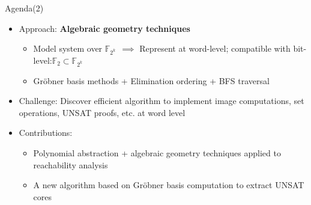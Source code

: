 \documentclass[xcolor=dvipsnames]{beamer}
\newcommand{\Fkk}{{\mathbb{F}}_{2^k}}
\newcommand{\Grobner}{Gr\"{o}bner\xspace}
\newcommand{\bi}{\begin{itemize}}
\newcommand{\ei}{\end{itemize}}
\begin{document}

\begin{frame}{\large {Agenda(2)}}
\bi
\item Approach: {\bf Algebraic geometry techniques}
	\begin{itemize}
	\item Model system over $\Fkk~~\implies$ Represent at word-level; compatible with bit-level:$\mathbb F_2\subset \Fkk$ 
	\item  \Grobner basis methods + Elimination ordering + BFS traversal
	\ei
\item  Challenge: Discover efficient algorithm to implement image computations, 
        set operations, UNSAT proofs, etc. at word level
\item  Contributions: 
    \bi
    \item Polynomial abstraction + algebraic geometry techniques 
         applied to reachability analysis
    \item A new algorithm based on \Grobner basis computation  to extract UNSAT cores
    \ei
\end{itemize}
\end{frame}

\end{document}
